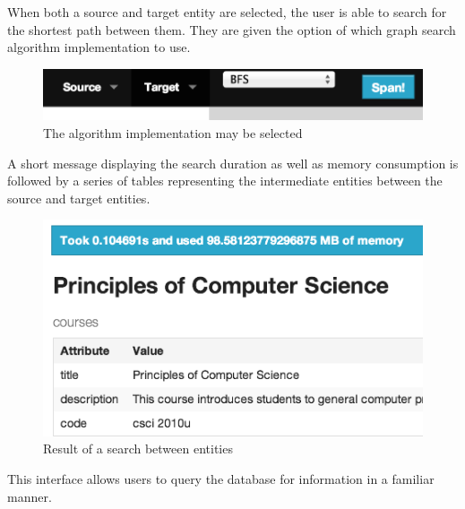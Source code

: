 		When both a source and target entity are selected, the user is able to search for the shortest path between them.  They are given the option of which graph search algorithm implementation to use.
		
		\begin{figure}[H]
			\centering
			\includegraphics[scale=0.5]{figures/images/step-4}
			
			\caption{The algorithm implementation may be selected}
			\label{fig:webui-step-4}
		\end{figure}
		
		A short message displaying the search duration as well as memory consumption is followed by a series of tables representing the intermediate entities between the source and target entities.
		
		\begin{figure}[H]
			\centering
			\includegraphics[scale=0.5]{figures/images/step-5}
			
			\caption{Result of a search between entities}
			\label{fig:webui-step-5}
		\end{figure}
		
		This interface allows users to query the database for information in a familiar manner.